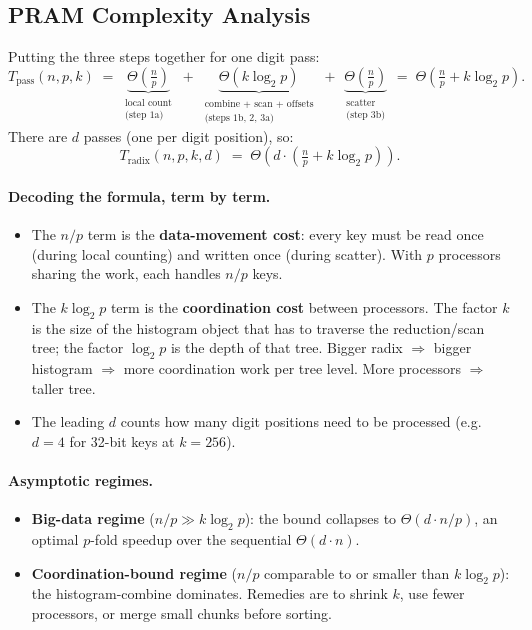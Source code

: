\subsection{PRAM Complexity Analysis}
\label{sec:radix-pram}

Putting the three steps together for one digit pass:
\[
T_{\mathrm{pass}}(n,p,k) \;=\;
\underbrace{\Theta\!\left(\tfrac{n}{p}\right)}_{\substack{\text{local count}\\ \text{(step 1a)}}}
\;+\;
\underbrace{\Theta(k \log_2 p)}_{\substack{\text{combine + scan + offsets}\\ \text{(steps 1b, 2, 3a)}}}
\;+\;
\underbrace{\Theta\!\left(\tfrac{n}{p}\right)}_{\substack{\text{scatter}\\ \text{(step 3b)}}}
\;=\;
\Theta\!\left(\tfrac{n}{p} + k \log_2 p\right).
\]
There are $d$ passes (one per digit position), so:
\[
\boxed{\;T_{\mathrm{radix}}(n, p, k, d) \;=\;
\Theta\!\left(d \cdot \left(\tfrac{n}{p} + k \log_2 p\right)\right).\;}
\]

\paragraph{Decoding the formula, term by term.}
\begin{itemize}[leftmargin=*]
  \item The $n/p$ term is the \textbf{data-movement cost}: every key
        must be read once (during local counting) and written once
        (during scatter). With $p$ processors sharing the work, each
        handles $n/p$ keys.
  \item The $k \log_2 p$ term is the \textbf{coordination cost} between
        processors. The factor $k$ is the size of the histogram object
        that has to traverse the reduction/scan tree; the factor
        $\log_2 p$ is the depth of that tree. Bigger radix $\Rightarrow$
        bigger histogram $\Rightarrow$ more coordination work per tree
        level. More processors $\Rightarrow$ taller tree.
  \item The leading $d$ counts how many digit positions need to be
        processed (e.g.\ $d = 4$ for 32-bit keys at $k = 256$).
\end{itemize}

\paragraph{Asymptotic regimes.}
\begin{itemize}[leftmargin=*]
  \item \textbf{Big-data regime} ($n/p \gg k \log_2 p$): the bound
        collapses to $\Theta(d \cdot n / p)$, an optimal $p$-fold
        speedup over the sequential $\Theta(d \cdot n)$.
  \item \textbf{Coordination-bound regime} ($n/p$ comparable to or
        smaller than $k \log_2 p$): the histogram-combine dominates.
        Remedies are to shrink $k$, use fewer processors, or merge
        small chunks before sorting.
\end{itemize}

